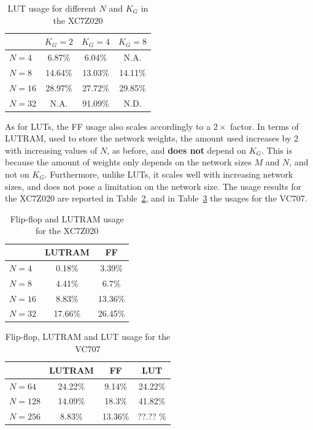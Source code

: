 \documentclass{IEEEtran}
\begin{document}
\begin{table}
	\caption{LUT usage for different $N$ and $K_G$ in the XC7Z020}
	\label{tab:lut}
    \centering
  \begin{tabular}{ | l | c | c | c |}
    \hline
    & $K_G=2$  & $K_G=4$ & $K_G=8$ \\
    \hline
    $N=4$ & 6.87\% & 6.04\% & N.A. \\
    \hline
    $N=8$ & 14.64\% & 13.03\% & 14.11\% \\
    \hline
    $N=16$ & 28.97\% & 27.72\% & 29.85\% \\
    \hline
    $N=32$ & N.A. & 91.09\% & N.D. \\
\hline
  \end{tabular}

\end{table}

As for LUTs, the FF usage also scales accordingly to a $2\times$ factor. In terms of LUTRAM, used to store the network weights,
the amount used increases by 2 with increasing values of $N$, as before, and \textbf{does not} depend on $K_G$. This is because
the amount of weights only depends on the network sizes $M$ and $N$, and not on $K_G$. Furthermore, unlike LUTs, it scales well
with increasing network sizes, and does not pose a limitation on the network size. The usage results for the XC7Z020 are reported in Table~\ref{tab:ff},
and in Table~\ref{tab:ff-virtx7} the usages for the VC707.

\begin{table}
	\caption{Flip-flop and LUTRAM usage for the XC7Z020}
	\label{tab:ff}
    \centering
  \begin{tabular}{ | l | c | c |}
    \hline
         & LUTRAM  & FF  \\
    \hline
    $N=4$ & 0.18\%  & 3.39\% \\
    \hline
    $N=8$ & 4.41\%  & 6.7\% \\
    \hline
    $N=16$ & 8.83\%  & 13.36\% \\
    \hline
    $N=32$ & 17.66\% &  26.45\% \\
\hline
  \end{tabular}

\end{table}


\begin{table}
	\caption{Flip-flop, LUTRAM and LUT usage for the VC707}
	\label{tab:ff-virtx7}
    \centering
  \begin{tabular}{ | l | c | c | c |}
    \hline
         & LUTRAM  & FF & LUT \\
    \hline
    $N=64$ & 24.22\%  & 9.14\% & 24.22\% \\
    \hline
    $N=128$ & 14.09\%  & 18.3\% & 41.82\%\\
    \hline
    $N=256$ & 8.83\%  & 13.36\% & ??.?? \%\\
\hline
  \end{tabular}

\end{table}
\end{document}

